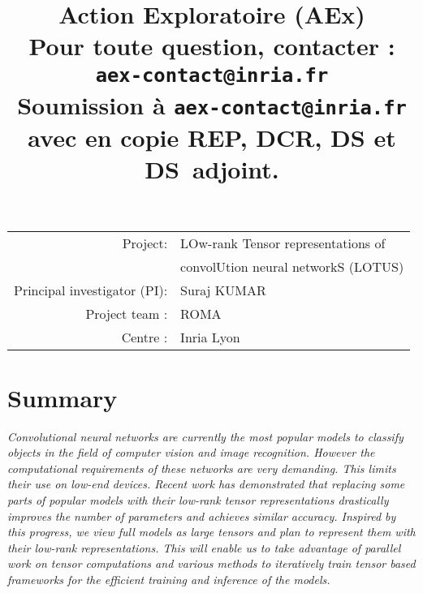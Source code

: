 \documentclass[11pt]{article}
\title{Action Exploratoire (AEx) \\
 {\normalsize Pour toute question, contacter : \texttt{aex-contact@inria.fr}} \\
  {\normalsize Soumission à \texttt{aex-contact@inria.fr}} \\ {\normalsize avec en copie REP, DCR, DS et DS~adjoint.} }
\author{}
\date{}
\begin{document}
\maketitle


\newcommand{\prname}{LOTUS\xspace}
	\begin{tabular}{rl}
		Project: & {\sc LOw-rank Tensor representations of}\\
		& {\sc convolUtion neural networkS (LOTUS)}\\
		Principal investigator (PI): & Suraj KUMAR\\
		Project team :&  ROMA\\
		Centre :& Inria Lyon
	\end{tabular}


\section*{Summary}
	\emph{Convolutional neural networks are currently the most popular models to classify objects in the field of computer vision and image recognition. However the computational requirements of these networks are very demanding. This limits their use on low-end devices. Recent work has demonstrated that replacing some parts of popular models with their low-rank tensor representations drastically improves the number of parameters and achieves similar accuracy. Inspired by this progress, we view full models as large tensors and plan to represent them with their low-rank representations. This will enable us to take advantage of parallel work on tensor computations and various methods to iteratively train tensor based frameworks for the efficient training and inference of the models.}
\end{document}
